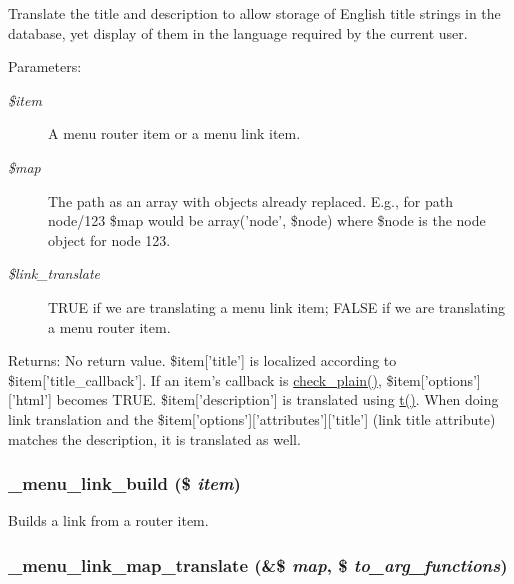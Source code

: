 Translate the title and description to allow storage of English title strings in the database, yet display of them in the language required by the current user.

\begin{Desc}
\item[Parameters:]
\begin{description}
\item[{\em \$item}]A menu router item or a menu link item. \item[{\em \$map}]The path as an array with objects already replaced. E.g., for path node/123 \$map would be array('node', \$node) where \$node is the node object for node 123. \item[{\em \$link\_\-translate}]TRUE if we are translating a menu link item; FALSE if we are translating a menu router item. \end{description}
\end{Desc}
\begin{Desc}
\item[Returns:]No return value. \$item\mbox{[}'title'\mbox{]} is localized according to \$item\mbox{[}'title\_\-callback'\mbox{]}. If an item's callback is \hyperlink{bootstrap_8inc_76fc67a30fd8d75ddd80565e6e65a13d}{check\_\-plain()}, \$item\mbox{[}'options'\mbox{]}\mbox{[}'html'\mbox{]} becomes TRUE. \$item\mbox{[}'description'\mbox{]} is translated using \hyperlink{common_8inc_41d20f0c822bf1f3c26a97981c762665}{t()}. When doing link translation and the \$item\mbox{[}'options'\mbox{]}\mbox{[}'attributes'\mbox{]}\mbox{[}'title'\mbox{]} (link title attribute) matches the description, it is translated as well. \end{Desc}
\hypertarget{group__menu_gdf1f694a2079dcdd6526150eb195915b}{
\subsubsection[{\_\-menu\_\-link\_\-build}]{\setlength{\rightskip}{0pt plus 5cm}\_\-menu\_\-link\_\-build (\$ {\em item})}}
\label{group__menu_gdf1f694a2079dcdd6526150eb195915b}


Builds a link from a router item. \hypertarget{group__menu_gac930b7a3cacbf70430c8dc3aa884198}{
\subsubsection[{\_\-menu\_\-link\_\-map\_\-translate}]{\setlength{\rightskip}{0pt plus 5cm}\_\-menu\_\-link\_\-map\_\-translate (\&\$ {\em map}, \/  \$ {\em to\_\-arg\_\-functions})}}
\label{group__menu_gac930b7a3cacbf70430c8dc3aa884198}


